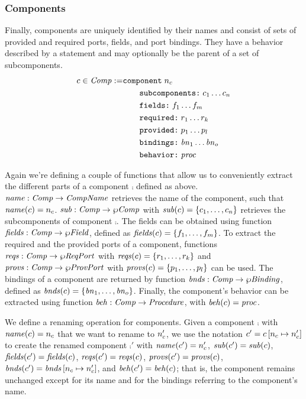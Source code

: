 \documentclass[a4paper,10pt,english]{article}
\begin{document}
\subsubsection{Components}
Finally, components are uniquely identified by their names and consist of sets
of provided and required ports, fields, and port bindings. They have a behavior described by a statement and may optionally be
the parent of a set of subcomponents.
\begin{align*}
	c \in \mathit{Comp} := & 
		\texttt{component} \; n_c\\&\qquad \texttt{subcomponents:} \; c_1 \ldots c_n\\&\qquad \texttt{fields:} \; f_1 \ldots f_m\\&\qquad \texttt{required:} \; r_1 \ldots r_k\\&\qquad \texttt{provided:} \; p_1 \ldots p_l\\&\qquad \texttt{bindings:} \; \mathit{bn}_1 \ldots \mathit{bn}_o\\&\qquad \texttt{behavior:} \; \mathit{proc}
\end{align*}

Again we're defining a couple of functions that allow us to conveniently extract the different parts of a component $\comp$
defined as above. $\mathit{name} : \mathit{Comp} \rightarrow \mathit{CompName}$ retrieves the name of the component, such that
$\mathit{name}(c) = n_c$. $\mathit{sub} : \mathit{Comp} \rightarrow \wp \mathit{Comp}$ with $\mathit{sub}(c) = \{c_1, \ldots, c_n\}$
retrieves the subcomponents of component $\comp$. The fields can be obtained using function $\mathit{fields} : \mathit{Comp} \rightarrow
\wp \mathit{Field}$, defined as $\mathit{fields}(c) = \{ f_1, \ldots, f_m \}$. To extract the required and the provided ports
of a component, functions $\mathit{reqs} : \mathit{Comp} \rightarrow \wp \mathit{ReqPort}$ with $\mathit{reqs}(c) = \{ r_1, \ldots, r_k \}$
and $\mathit{provs} : \mathit{Comp} \rightarrow \wp \mathit{ProvPort}$ with $\mathit{provs}(c) = \{ p_1, \ldots, p_l \}$ can be used. The
bindings of a component are returned by function $\mathit{bnds} : \mathit{Comp} \rightarrow \wp \mathit{Binding}$, defined as $\mathit{bnds}(c) =
\{ \mathit{bn}_1, \ldots, \mathit{bn}_o \}$. Finally, the component's behavior can be extracted using function $\mathit{beh} : \mathit{Comp}
\rightarrow \mathit{Procedure}$, with $\mathit{beh}(c) = \mathit{proc}$.

We define a renaming operation for components. Given a component $\comp$ with $\mathit{name}(c) = n_c$ that we want to
rename to $n_c'$, we use the notation $c' = c\left[n_c\mapsto n_c'\right]$ to create the renamed
component $\comp'$ with $\mathit{name}(c') = n_c'$, $\mathit{sub}(c') = \mathit{sub}(c)$, $\mathit{fields}(c')=\mathit{fields}(c)$,
$\mathit{reqs}(c') = \mathit{reqs}(c)$, $\mathit{provs}(c') = \mathit{provs}(c)$, $\mathit{bnds}(c') =
\mathit{bnds}\left[n_c\mapsto n_c'\right]$, and $\mathit{beh}(c') = \mathit{beh}(c)$; that is, the component remains unchanged
except for its name and for the bindings referring to the component's name.
\end{document}

